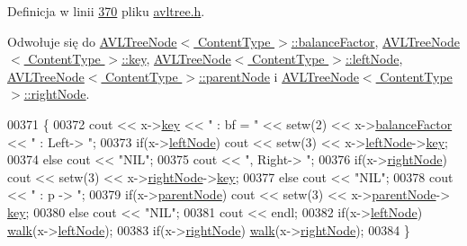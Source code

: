 Definicja w linii \hyperlink{avltree_8h_source_l00370}{370} pliku \hyperlink{avltree_8h_source}{avltree.\-h}.



Odwołuje się do \hyperlink{avltreeelement_8h_source_l00024}{A\-V\-L\-Tree\-Node$<$ Content\-Type $>$\-::balance\-Factor}, \hyperlink{avltreeelement_8h_source_l00024}{A\-V\-L\-Tree\-Node$<$ Content\-Type $>$\-::key}, \hyperlink{avltreeelement_8h_source_l00019}{A\-V\-L\-Tree\-Node$<$ Content\-Type $>$\-::left\-Node}, \hyperlink{avltreeelement_8h_source_l00019}{A\-V\-L\-Tree\-Node$<$ Content\-Type $>$\-::parent\-Node} i \hyperlink{avltreeelement_8h_source_l00019}{A\-V\-L\-Tree\-Node$<$ Content\-Type $>$\-::right\-Node}.


\begin{DoxyCode}
00371     \{
00372       cout << x->\hyperlink{class_a_v_l_tree_node_a717c2f6c33504a065570802e95189a57}{key} << \textcolor{stringliteral}{" : bf = "} << setw(2) << x->\hyperlink{class_a_v_l_tree_node_a212c57dab467b42c3ddc50b2aecc05ad}{balanceFactor} << \textcolor{stringliteral}{" : Left-> "};
00373       \textcolor{keywordflow}{if}(x->\hyperlink{class_a_v_l_tree_node_afc53d4774f375c23795c9eb598f4d7cd}{leftNode}) cout << setw(3) << x->\hyperlink{class_a_v_l_tree_node_afc53d4774f375c23795c9eb598f4d7cd}{leftNode}->\hyperlink{class_a_v_l_tree_node_a717c2f6c33504a065570802e95189a57}{key};
00374       \textcolor{keywordflow}{else}        cout << \textcolor{stringliteral}{"NIL"};
00375       cout << \textcolor{stringliteral}{", Right-> "};
00376       \textcolor{keywordflow}{if}(x->\hyperlink{class_a_v_l_tree_node_a51dfb148f27625c89a3a153760517c38}{rightNode}) cout << setw(3) << x->\hyperlink{class_a_v_l_tree_node_a51dfb148f27625c89a3a153760517c38}{rightNode}->\hyperlink{class_a_v_l_tree_node_a717c2f6c33504a065570802e95189a57}{key};
00377       \textcolor{keywordflow}{else}         cout << \textcolor{stringliteral}{"NIL"};
00378       cout << \textcolor{stringliteral}{" : p -> "};
00379       \textcolor{keywordflow}{if}(x->\hyperlink{class_a_v_l_tree_node_ae64d1261fea217d3e85928e7cf2a9151}{parentNode}) cout << setw(3) << x->\hyperlink{class_a_v_l_tree_node_ae64d1261fea217d3e85928e7cf2a9151}{parentNode}->
      \hyperlink{class_a_v_l_tree_node_a717c2f6c33504a065570802e95189a57}{key};
00380       \textcolor{keywordflow}{else}     cout << \textcolor{stringliteral}{"NIL"};
00381       cout << endl;
00382       \textcolor{keywordflow}{if}(x->\hyperlink{class_a_v_l_tree_node_afc53d4774f375c23795c9eb598f4d7cd}{leftNode})  \hyperlink{class_a_v_l_tree_a3b7cf893799114e3ebca387a1910fdc8}{walk}(x->\hyperlink{class_a_v_l_tree_node_afc53d4774f375c23795c9eb598f4d7cd}{leftNode});
00383       \textcolor{keywordflow}{if}(x->\hyperlink{class_a_v_l_tree_node_a51dfb148f27625c89a3a153760517c38}{rightNode}) \hyperlink{class_a_v_l_tree_a3b7cf893799114e3ebca387a1910fdc8}{walk}(x->\hyperlink{class_a_v_l_tree_node_a51dfb148f27625c89a3a153760517c38}{rightNode});
00384     \}
\end{DoxyCode}


